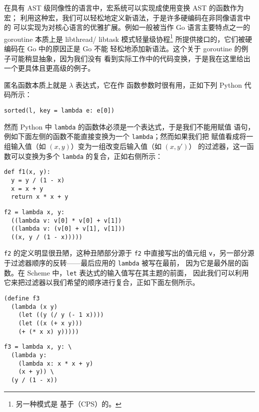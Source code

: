 在具有 AST 级同像性的语言中，宏系统可以实现成使用变换 AST 的函数作为宏；
利用这种宏，我们可以轻松地定义新语法，于是许多硬编码在非同像语言中的%
可以实现为对核心语言的优雅扩展。例如一般被当作 Go
语言主要特点之一的 goroutine 本质上是 libthread/%
libtask 模式轻量级协程\footnote{另一种模式是
基于（CPS）的。}%
所提供接口的，它们被硬编码在 Go 中的原因正是 Go 不能
轻松地添加新语法。这个关于 goroutine 的例子可能稍显抽象，因为我们没有
看到实际工作中的代码变换，于是我在这里给出一个更具体且更高级的例子。

匿名函数本质上就是 $\lambda$ 表达式，它在作
函数参数时很有用，正如下列 Python 代码所示：
\begin{quoting}
\begin{Verbatim}
sorted(l, key = lambda e: e[0])
\end{Verbatim}
\end{quoting}
然而 Python 中 \verb|lambda| 的函数体必须是一个表达式，于是我们不能用赋值
语句，例如下面左侧的函数不能直接变换为一个 \verb|lambda|；然而如果我们把
赋值看成将一组输入值（如 $(x, y)$）变为一组改变后输入值（如 $(x, y')$）
的过滤器，这一函数可以变换为多个 \verb|lambda| 的复合，正如右侧所示：
\colskipa\begin{multicols}{2}
\begin{quoting}
\begin{Verbatim}
def f1(x, y):
  y = y / (1 - x)
  x = x + y
  return x * x + y
\end{Verbatim}
\end{quoting}
\begin{quoting}
\begin{Verbatim}
f2 = lambda x, y:
  ((lambda v: v[0] * v[0] + v[1])
  ((lambda v: (v[0] + v[1], v[1]))
  ((x, y / (1 - x)))))
\end{Verbatim}
\end{quoting}
\end{multicols}\colskipb\noindent%
\verb|f2| 的定义明显很丑陋，这种丑陋部分源于 \verb|f2| 中直接写出的值元组
\verb|v|，另一部分源于过滤器顺序的反转——最后应用的 \verb|lambda| 被写在最前，
因为它是最外层的函数。在 Scheme 中，\verb|let| 表达式的输入值写在其主题的前面，
因此我们可以利用它来把过滤器以我们希望的顺序进行复合，正如下面左侧所示。
\colskipa\begin{multicols}{2}
\begin{quoting}
\begin{Verbatim}
(define f3
  (lambda (x y)
    (let ((y (/ y (- 1 x))))
    (let ((x (+ x y)))
    (+ (* x x) y)))))
\end{Verbatim}
\end{quoting}
\begin{quoting}
\begin{Verbatim}
f3 = lambda x, y: \
  (lambda y:
    (lambda x: x * x + y)
    (x + y)) \
  (y / (1 - x))
\end{Verbatim}
\end{quoting}
\end{multicols}\colskipb\noindent%
